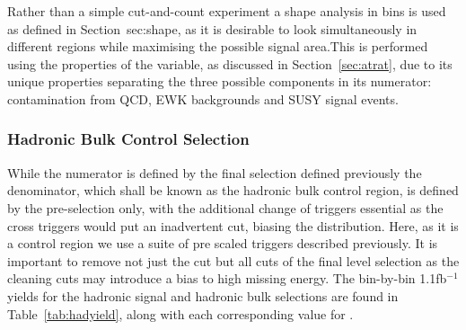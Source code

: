 Rather than a simple cut-and-count experiment a shape analysis in \HT bins is used as defined in Section~{sec:shape}, as it is desirable to look simultaneously in different \HT regions while maximising the possible signal area.This is performed using the properties of the \RaT variable, as discussed in Section~\ref{sec:atrat}, due to its unique properties separating the three possible components in its numerator: contamination from QCD, EWK backgrounds and SUSY signal events.

\subsubsection{Hadronic Bulk Control Selection}
While the numerator is defined by the final selection defined previously the denominator, which shall be known as the hadronic bulk control region, is defined by the pre-selection only, with the additional change of triggers essential as the cross triggers would put an inadvertent \MHT cut, biasing the \alt distribution. Here, as it is a control region we use a suite of pre scaled \HT triggers described previously. It is important to remove not just the \alt cut but all cuts of the final level selection as the cleaning cuts may introduce a bias to high missing energy. The bin-by-bin 1.1fb$^{-1}$ yields for the hadronic signal and hadronic bulk selections are found in Table~\ref{tab:hadyield}, along with each corresponding value for \RaT.

